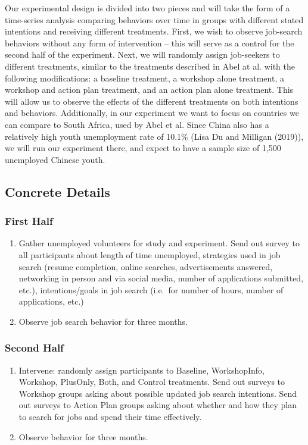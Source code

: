 \documentclass[]{elsarticle} %
\begin{document}
Our experimental design is divided into two pieces and will take the
form of a time-series analysis comparing behaviors over time in groups
with different stated intentions and receiving different treatments.
First, we wish to observe job-search behaviors without any form of
intervention -- this will serve as a control for the second half of the
experiment. Next, we will randomly assign job-seekers to different
treatments, similar to the treatments described in Abel at al. with the
following modifications: a baseline treatment, a workshop alone
treatment, a workshop and action plan treatment, and an action plan
alone treatment. This will allow us to observe the effects of the
different treatments on both intentions and behaviors. Additionally, in
our experiment we want to focus on countries we can compare to South
Africa, used by Abel et al. Since China also has a relatively high youth
unemployment rate of 10.1\% (Lisa Du and Milligan (2019)), we will run
our experiment there, and expect to have a sample size of 1,500
unemployed Chinese youth.

\subsection{Concrete Details}\label{concrete-details}

\subsubsection{First Half}\label{first-half}

\begin{enumerate}
\def\labelenumi{\arabic{enumi}.}
\item
  Gather unemployed volunteers for study and experiment. Send out survey
  to all participants about length of time unemployed, strategies used
  in job search (resume completion, online searches, advertisements
  answered, networking in person and via social media, number of
  applications submitted, etc.), intentions/goals in job search
  (i.e.~for number of hours, number of applications, etc.)
\item
  Observe job search behavior for three months.
\end{enumerate}

\subsubsection{Second Half}\label{second-half}

\begin{enumerate}
\def\labelenumi{\arabic{enumi}.}
\item
  Intervene: randomly assign participants to Baseline, WorkshopInfo,
  Workshop, PlusOnly, Both, and Control treatments. Send out surveys to
  Workshop groups asking about possible updated job search intentions.
  Send out surveys to Action Plan groups asking about whether and how
  they plan to search for jobs and spend their time effectively.
\item
  Observe behavior for three months.
\end{enumerate}
\end{document}
